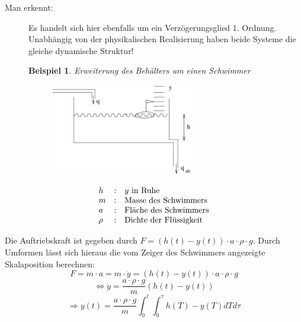 \message{ !name(Mitschrieb_SysRegel.tex)}\documentclass[12pt,a4paper,ngerman]{scrartcl}
\newtheorem{bsp}{Beispiel}[section] %
\begin{document}
\begin{description}
\item[Man erkennt:] Es handelt sich hier ebenfalls um ein Verzögerungsglied 1. Ordnung. Unabhängig von der physikalischen Realisierung haben beide Systeme die gleiche dynamische Struktur!
\end{description}
\begin{figure}[H]
\begin{bsp}
Erweiterung des Behälters um einen Schwimmer
\end{bsp}
\begin{minipage}{.4\linewidth}
\begin{figure}[H]
  \includegraphics[height=4cm]{sysregel_bsp_4}
\end{figure}
\end{minipage}
\begin{minipage}{.6\linewidth}
\begin{align*}
\begin{array}{lll}
h&:& y $ in Ruhe$\\
m&:& $Masse des Schwimmers$\\
a&:& $Fläche des Schwimmers$\\
\rho&:& $Dichte der Flüssigkeit$\\
\end{array}
\end{align*}
\end{minipage}
\end{figure}
Die Auftriebskraft ist gegeben durch $F= (h(t)-y(t))\cdot a \cdot \rho \cdot g$. Durch Umformen lässt sich hieraus die vom Zeiger des Schwimmers angezeigte Skalaposition berechnen:
\begin{equation*}
  F=m \cdot a = m \cdot \ddot{y}=(h(t)-y(t))\cdot a \cdot \rho \cdot g
\end{equation*}
\begin{equation*}
  \Leftrightarrow \ddot{y}= \frac{a \cdot \rho \cdot g}{m}(h(t)-y(t))
\end{equation*}
\begin{equation*}
  \Rightarrow y(t) = \frac{a \cdot \rho \cdot g}{m}\int_0^t{\int_0^\tau{h(T)-y(T)dT}d\tau}
\end{equation*}
\end{document}

